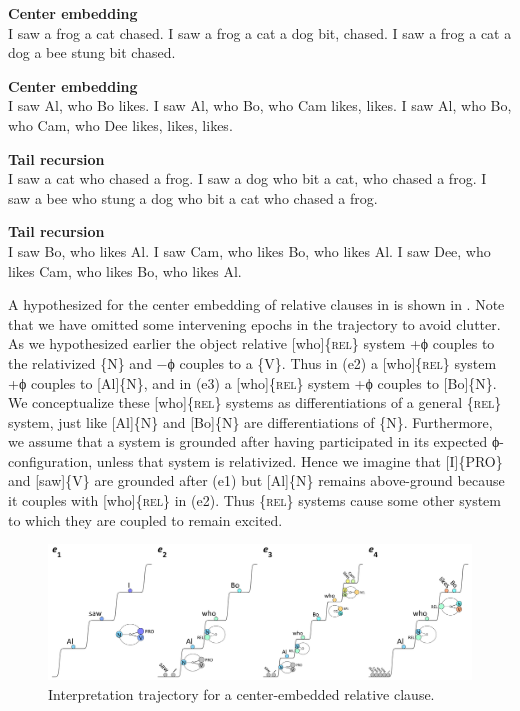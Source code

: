 \ea\label{ex:6:15}
\textbf{Center embedding}\\
    \ea I saw a frog a cat chased.                      
    \ex I saw a frog a cat a dog bit, chased.  
    \ex I saw a frog a cat a dog a bee stung bit chased.
    \z
\z

\ea\label{ex:6:16}
\textbf{Center embedding}\\
    \ea\label{ex:6:16a} I saw Al, who Bo likes.                                
    \ex\label{ex:6:16b} I saw Al, who Bo, who Cam likes, likes.                
    \ex\label{ex:6:16c} I saw Al, who Bo, who Cam, who Dee likes, likes, likes.
    \z
\z

\ea\label{ex:6:17}
\textbf{Tail recursion}\\
    \ea I saw a cat who chased a frog.
    \ex I saw a dog who bit a cat, who chased a frog.
    \ex I saw a bee who stung a dog who bit a cat who chased a frog.
    \z
\z

\ea\label{ex:6:18}
\textbf{Tail recursion}\\
    \ea I saw Bo, who likes Al.
    \ex\label{ex:6:18b} I saw Cam, who likes Bo, who likes Al.
    \ex\label{ex:6:18c} I saw Dee, who likes Cam, who likes Bo, who likes Al.
    \z
\z
  

  A hypothesized  for the center embedding of relative clauses in  is shown in {}. Note that we have omitted some intervening epochs in the trajectory to avoid clutter. As we hypothesized earlier the object relative [who]\{\textsc{rel}\} system +ϕ couples to the relativized \{N\} and −ϕ couples to a \{V\}. Thus in (e2) a [who]\{\textsc{rel}\} system +ϕ couples to [Al]\{N\}, and in (e3) a [who]\{\textsc{rel}\} system +ϕ couples to [Bo]\{N\}. We conceptualize these [who]\{\textsc{rel}\} systems as differentiations of a general \{\textsc{rel}\} system, just like [Al]\{N\} and [Bo]\{N\} are differentiations of \{N\}. Furthermore, we assume that a system is grounded after having participated in its expected ϕ-con\-fi\-gu\-ra\-tion, unless that system is relativized. Hence we imagine that [I]\{\textsc{PRO}\} and [saw]\{V\} are grounded after (e1) but [Al]\{N\} remains above-ground because it couples with [who]\{\textsc{rel}\} in (e2). Thus \{\textsc{rel}\} systems cause some other system to which they are coupled to remain excited.

  
\begin{figure}
\includegraphics[width=\textwidth]{figures/Tilsen-img132.png}
\caption{Interpretation trajectory for a center-embedded relative clause.}
\label{fig:6:13}
\end{figure}
 

